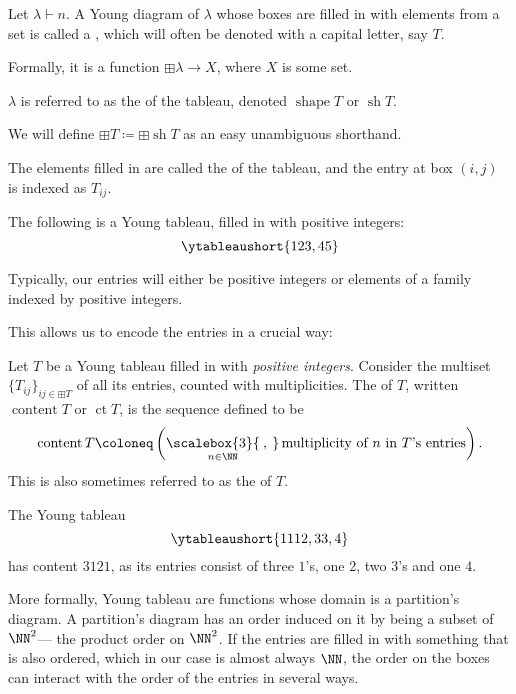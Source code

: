 \documentclass{article}
\newcommand{\bigcomma}{\ensuremath{\mathop{\scalebox{3}{\:,\:}}\limits}}
\DeclareMathOperator{\shape}{shape}
\DeclareMathOperator{\sh}{sh}
\DeclareMathOperator{\content}{content}
\DeclareMathOperator{\ct}{ct}
\begin{document}
\begin{definition}
    Let $\lambda \vdash n$. A Young diagram of $\lambda$ whose boxes are filled in with elements from a set is called a , which will often be denoted with a capital letter, say $T$. 

    Formally, it is a function $\boxplus \lambda \to X$, where $X$ is some set.

    $\lambda$ is referred to as the  of the tableau, denoted $\shape T$ or $\sh T$.

    We will define $\boxplus T \coloneq \boxplus \sh T$ as an easy unambiguous shorthand.

    The elements filled in are called the  of the tableau, and the entry at box $(i,j)$ is indexed as $T_{ij}$.
\end{definition}

\begin{example}
    The following is a Young tableau, filled in with positive integers:
    \[
        \ytableaushort{123,45}
    \]
\end{example}

Typically, our entries will either be positive integers or elements of a family indexed by positive integers.

This allows us to encode the entries in a crucial way:

\begin{definition}
    Let $T$ be a Young tableau filled in with \textit{positive integers}.
    Consider the multiset $\{T_{ij}\}_{ij \in \boxplus T}$ of all its entries, counted with multiplicities.
    The  of $T$, written $\content T$ or $\ct T$, is the sequence defined to be
    \[
        \content T
        \coloneq
        \left(
            \bigcomma_{n \in \NN}
            \text{multiplicity of }n\text{ in }T\text{'s entries}
        \right).
    \]
    This is also sometimes referred to as the  of $T$.
\end{definition}

\begin{example}
    The Young tableau
    \[
        \ytableaushort{1112,33,4}
    \]
    has content $3121$, as its entries consist of three $1$'s, one $2$, two $3$'s and one $4$.
\end{example}

More formally, Young tableau are functions whose domain is a partition's diagram.
A partition's diagram has an order induced on it by being a subset of $\NN^2$--- the product order on $\NN^2$.
If the entries are filled in with something that is also ordered, which in our case is almost always $\NN$, the order on the boxes can interact with the order of the entries in several ways.
\end{document}
